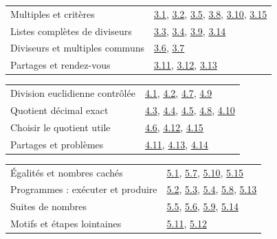 \begin{tabularx}{\linewidth}{@{}Yl@{}}\toprule
Multiples et critères & \hyperref[exo-3-1]{3.1}, \hyperref[exo-3-2]{3.2}, \hyperref[exo-3-5]{3.5}, \hyperref[exo-3-8]{3.8}, \hyperref[exo-3-10]{3.10}, \hyperref[exo-3-15]{3.15}\\[2mm]
Listes complètes de diviseurs & \hyperref[exo-3-3]{3.3}, \hyperref[exo-3-4]{3.4}, \hyperref[exo-3-9]{3.9}, \hyperref[exo-3-14]{3.14}\\[2mm]
Diviseurs et multiples communs & \hyperref[exo-3-6]{3.6}, \hyperref[exo-3-7]{3.7}\\[2mm]
Partages et rendez-vous & \hyperref[exo-3-11]{3.11}, \hyperref[exo-3-12]{3.12}, \hyperref[exo-3-13]{3.13}\\[2mm]
\bottomrule\end{tabularx}\par\vspace{4mm}
\clearpage
{}\fontsize{10}{13}\selectfont
{}\begin{tabularx}{\linewidth}{@{}Yl@{}}\toprule
Division euclidienne contrôlée & \hyperref[exo-4-1]{4.1}, \hyperref[exo-4-2]{4.2}, \hyperref[exo-4-7]{4.7}, \hyperref[exo-4-9]{4.9}\\[2mm]
Quotient décimal exact & \hyperref[exo-4-3]{4.3}, \hyperref[exo-4-4]{4.4}, \hyperref[exo-4-5]{4.5}, \hyperref[exo-4-8]{4.8}, \hyperref[exo-4-10]{4.10}\\[2mm]
Choisir le quotient utile & \hyperref[exo-4-6]{4.6}, \hyperref[exo-4-12]{4.12}, \hyperref[exo-4-15]{4.15}\\[2mm]
Partages et problèmes & \hyperref[exo-4-11]{4.11}, \hyperref[exo-4-13]{4.13}, \hyperref[exo-4-14]{4.14}\\[2mm]
\bottomrule\end{tabularx}\par\vspace{4mm}
\begin{tabularx}{\linewidth}{@{}Yl@{}}\toprule
Égalités et nombres cachés & \hyperref[exo-5-1]{5.1}, \hyperref[exo-5-7]{5.7}, \hyperref[exo-5-10]{5.10}, \hyperref[exo-5-15]{5.15}\\[2mm]
Programmes : exécuter et produire & \hyperref[exo-5-2]{5.2}, \hyperref[exo-5-3]{5.3}, \hyperref[exo-5-4]{5.4}, \hyperref[exo-5-8]{5.8}, \hyperref[exo-5-13]{5.13}\\[2mm]
Suites de nombres & \hyperref[exo-5-5]{5.5}, \hyperref[exo-5-6]{5.6}, \hyperref[exo-5-9]{5.9}, \hyperref[exo-5-14]{5.14}\\[2mm]
Motifs et étapes lointaines & \hyperref[exo-5-11]{5.11}, \hyperref[exo-5-12]{5.12}\\[2mm]
\bottomrule\end{tabularx}\par\vspace{4mm}
